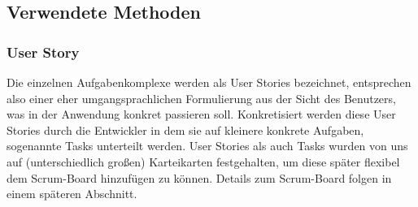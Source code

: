 \subsection{Verwendete Methoden}
\subsubsection{User Story}
Die einzelnen Aufgabenkomplexe werden als User Stories bezeichnet, entsprechen also einer eher umgangsprachlichen Formulierung aus der Sicht des Benutzers, was in der Anwendung konkret passieren soll.
Konkretisiert werden diese User Stories durch die Entwickler in dem sie auf kleinere konkrete Aufgaben, sogenannte Tasks unterteilt werden.
User Stories als auch Tasks wurden von uns auf (unterschiedlich großen) Karteikarten festgehalten, um diese später flexibel dem Scrum-Board hinzufügen zu können. Details zum Scrum-Board folgen in einem späteren Abschnitt.

